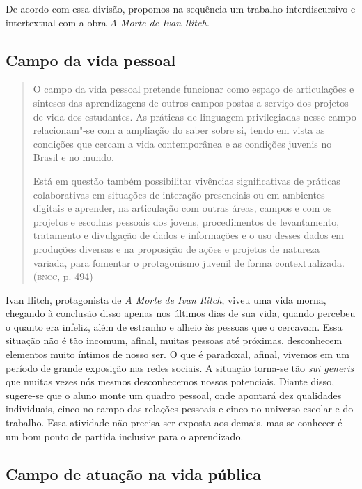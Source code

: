 \documentclass[12pt]{extarticle}
\begin{document}
De acordo com essa divisão, propomos na sequência um trabalho
interdiscursivo e intertextual com a obra \emph{A Morte de Ivan Ilitch.}

\subsection{Campo da vida pessoal}

\begin{quote}
O campo da vida pessoal pretende funcionar como espaço de articulações
e sínteses das aprendizagens de outros campos postas a serviço dos
projetos de vida dos estudantes. As práticas de linguagem privilegiadas
nesse campo relacionam"-se com a ampliação do saber sobre si, tendo em
vista as condições que cercam a vida contemporânea e as condições
juvenis no Brasil e no mundo.

Está em questão também possibilitar vivências significativas de práticas
colaborativas em situações de interação presenciais ou em ambientes
digitais e aprender, na articulação com outras áreas, campos e com os
projetos e escolhas pessoais dos jovens, procedimentos de levantamento,
tratamento e divulgação de dados e informações e o uso desses dados em
produções diversas e na proposição de ações e projetos de natureza
variada, para fomentar o protagonismo juvenil de forma
contextualizada. (\textsc{bncc}, p. 494)
\end{quote}

Ivan Ilitch, protagonista de \emph{A Morte de Ivan Ilitch}, viveu uma
vida morna, chegando à conclusão disso apenas nos últimos dias de sua
vida, quando percebeu o quanto era infeliz, além de estranho e alheio
às pessoas que o cercavam. Essa situação não é tão incomum, afinal,
muitas pessoas até próximas, desconhecem elementos muito íntimos de
nosso ser. O que é paradoxal, afinal, vivemos em um período de grande
exposição nas redes sociais. A situação torna-se tão \emph{sui
generis} que muitas vezes nós mesmos desconhecemos nossos potenciais.
Diante disso, sugere-se que o aluno monte um quadro pessoal, onde
apontará dez qualidades individuais, cinco no campo das relações
pessoais e cinco no universo escolar e do trabalho. Essa atividade não
precisa ser exposta aos demais, mas se conhecer é um bom ponto de
partida inclusive para o aprendizado.

\subsection{Campo de atuação na vida pública}
\end{document}
